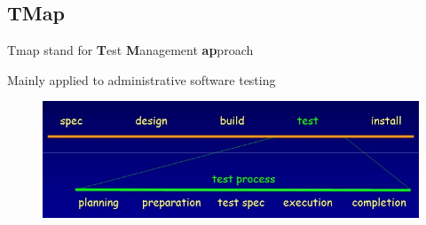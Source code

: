 \subsection{TMap}
Tmap stand for \textbf{T}est \textbf{M}anagement \textbf{ap}proach

Mainly applied to administrative software testing

\begin{figure}[h!]
	\centering
	\includegraphics[width=0.7\linewidth]{../images/tmap1.jpg}
	\caption{}
	\label{fig:tmap1}
\end{figure}

